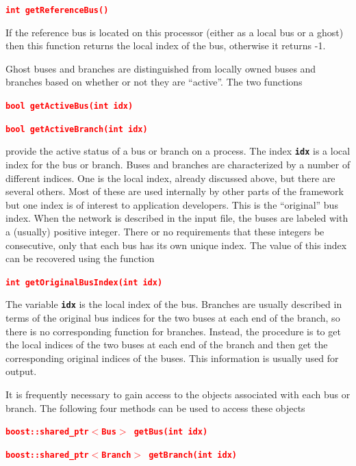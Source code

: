 \documentclass[12pt]{report} %
\begin{document}
\textcolor{red}{\texttt{\textbf{int getReferenceBus()}}}

If the reference bus is located on this processor (either as a local bus or a ghost) then this function returns the local index of the bus, otherwise it returns -1.

Ghost buses and branches are distinguished from locally owned buses and branches based on whether or not they are ``active''. The two functions

\textcolor{red}{\texttt{\textbf{bool getActiveBus(int idx)}}}
\textcolor{red}{\texttt{\textbf{}}}

\textcolor{red}{\texttt{\textbf{bool getActiveBranch(int idx)}}}

provide the active status of a bus or branch on a process. The index \texttt{\textbf{idx}} is a local index for the bus or branch.
Buses and branches are characterized by a number of different indices. One is the local index, already discussed above, but there are several others. Most of these are used internally by other parts of the framework but one index is of interest to application developers. This is the ``original'' bus index. When the network is described in the input file, the buses are labeled with a (usually) positive integer. There or no requirements that these integers be consecutive, only that each bus has its own unique index. The value of this index can be recovered using the function

\textcolor{red}{\texttt{\textbf{int getOriginalBusIndex(int idx)}}}

The variable \texttt{\textbf{idx}} is the local index of the bus. Branches are usually described in terms of the original bus indices for the two buses at each end of the branch, so there is no corresponding function for branches. Instead, the procedure is to get the local indices of the two buses at each end of the branch and then get the corresponding original indices of the buses. This information is usually used for output.

It is frequently necessary to gain access to the objects associated with each bus or branch. The following four methods can be used to access these objects

\textcolor{red}{\texttt{\textbf{boost::shared\_ptr$\boldsymbol{\mathrm{<}}$Bus$\boldsymbol{\mathrm{>}}$ getBus(int idx)}}}
\textcolor{red}{\texttt{\textbf{}}}

\textcolor{red}{\texttt{\textbf{boost::shared\_ptr$\boldsymbol{\mathrm{<}}$Branch$\boldsymbol{\mathrm{>}}$ getBranch(int idx)}}}
\textcolor{red}{\texttt{\textbf{}}}
\end{document}
